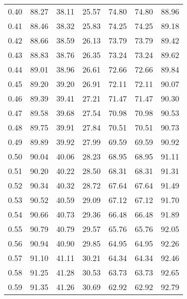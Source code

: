 \begin{tabular}{|c|c|c|c|c|c|c|}
      0.40 &     88.27 &     38.11 &      25.57 &   74.80 &      74.80 &         88.96 \\
      0.41 &     88.46 &     38.32 &      25.83 &   74.25 &      74.25 &         89.18 \\
      0.42 &     88.66 &     38.59 &      26.13 &   73.79 &      73.79 &         89.42 \\
      0.43 &     88.83 &     38.76 &      26.35 &   73.24 &      73.24 &         89.62 \\
      0.44 &     89.01 &     38.96 &      26.61 &   72.66 &      72.66 &         89.84 \\
      0.45 &     89.20 &     39.20 &      26.91 &   72.11 &      72.11 &         90.07 \\
      0.46 &     89.39 &     39.41 &      27.21 &   71.47 &      71.47 &         90.30 \\
      0.47 &     89.58 &     39.68 &      27.54 &   70.98 &      70.98 &         90.53 \\
      0.48 &     89.75 &     39.91 &      27.84 &   70.51 &      70.51 &         90.73 \\
      0.49 &     89.89 &     39.92 &      27.99 &   69.59 &      69.59 &         90.92 \\
      0.50 &     90.04 &     40.06 &      28.23 &   68.95 &      68.95 &         91.11 \\
      0.51 &     90.20 &     40.22 &      28.50 &   68.31 &      68.31 &         91.31 \\
      0.52 &     90.34 &     40.32 &      28.72 &   67.64 &      67.64 &         91.49 \\
      0.53 &     90.52 &     40.59 &      29.09 &   67.12 &      67.12 &         91.70 \\
      0.54 &     90.66 &     40.73 &      29.36 &   66.48 &      66.48 &         91.89 \\
      0.55 &     90.79 &     40.79 &      29.57 &   65.76 &      65.76 &         92.05 \\
      0.56 &     90.94 &     40.90 &      29.85 &   64.95 &      64.95 &         92.26 \\
      0.57 &     91.10 &     41.11 &      30.21 &   64.34 &      64.34 &         92.46 \\
      0.58 &     91.25 &     41.28 &      30.53 &   63.73 &      63.73 &         92.65 \\
      0.59 &     91.35 &     41.26 &      30.69 &   62.92 &      62.92 &         92.79 \\

\end{tabular}
